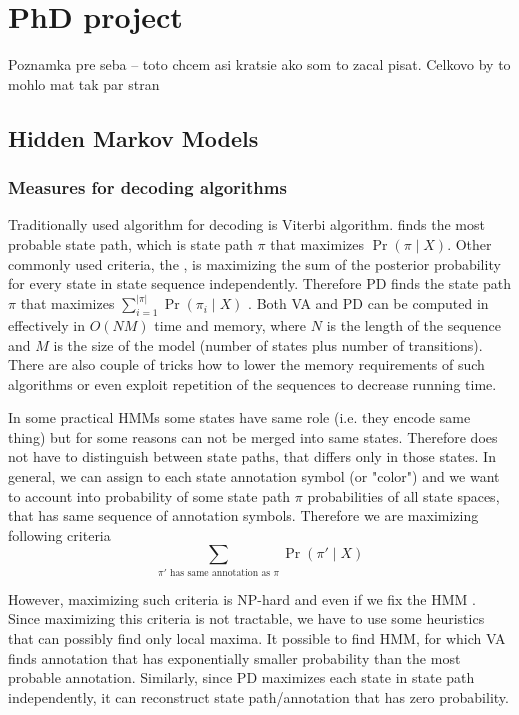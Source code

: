 \chapter{PhD project}

Poznamka pre seba -- toto chcem asi kratsie ako som to zacal pisat. Celkovo by
to mohlo mat tak par stran

\section{Hidden Markov Models}

\subsection{Measures for decoding algorithms}

Traditionally used algorithm for decoding  is Viterbi
algorithm.  finds the most probable state path, which is
state path $\pi$ that maximizes $\Pr\left(\pi \mid X\right)$. Other commonly
used criteria, the , is maximizing the sum of the posterior
probability for every state in state sequence independently. Therefore PD finds
the state path $\pi$ that maximizes $\sum_{i=1}^{|\pi|} \Pr\left(\pi_i \mid
X\right)$ . Both VA and PD can be
computed in effectively in $O(NM)$ time and memory, where $N$ is the
length of the sequence and $M$ is the size of the model (number of states plus
number of transitions). There are also couple of tricks how to lower the memory
requirements of such algorithms or even exploit repetition of the sequences to
decrease running time.

In some practical HMMs some states have same role (i.e. they encode same thing)
but for some reasons can not be merged into same states. Therefore does not have
to distinguish between state paths, that differs only in those states. In
general, we can assign to each state annotation symbol (or "color") and we want
to account into probability of some state path $\pi$ probabilities of all state
spaces, that has same sequence of annotation symbols. Therefore we are
maximizing following criteria
\[\sum_{\pi'\textrm{ has same annotation as }\pi}\Pr\left( \pi' \mid X \right)\]

However, maximizing such criteria is NP-hard \cite{???} and even if we fix the
HMM \cite{Brejova2005}. Since maximizing this criteria is not tractable, we have
to use some heuristics that can possibly find only local maxima. It possible to
find HMM, for which VA finds annotation that has exponentially smaller
probability than the most probable annotation. Similarly, since PD maximizes
each state in state path independently, it can reconstruct state path/annotation
that has zero probability.

